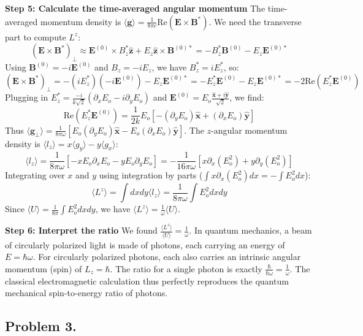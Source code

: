 \begin{solution}
\textbf{Step 5: Calculate the time-averaged angular momentum}
The time-averaged momentum density is $\langle \mathbf{g} \rangle = \frac{1}{8\pi c} \text{Re}(\mathbf{E} \times \mathbf{B}^*)$. We need the transverse part to compute $L^z$:
\[ (\mathbf{E} \times \mathbf{B}^*)_\perp \approx \mathbf{E}^{(0)} \times B_z^* \hat{\mathbf{z}} + E_z \hat{\mathbf{z}} \times \mathbf{B}^{(0)*} = - B_z^* \mathbf{B}^{(0)} - E_z \mathbf{E}^{(0)*} \]
Using $\mathbf{B}^{(0)} = -i \mathbf{E}^{(0)}$ and $B_z = -i E_z$, we have $B_z^* = i E_z^*$, so:
\[ (\mathbf{E} \times \mathbf{B}^*)_\perp = - (i E_z^*) (-i \mathbf{E}^{(0)}) - E_z \mathbf{E}^{(0)*} = - E_z^* \mathbf{E}^{(0)} - E_z \mathbf{E}^{(0)*} = -2 \text{Re}(E_z^* \mathbf{E}^{(0)}) \]
Plugging in $E_z^* = \frac{-i}{k\sqrt{2}} (\partial_x E_o - i \partial_y E_o)$ and $\mathbf{E}^{(0)} = E_o \frac{\hat{\mathbf{x}} + i\hat{\mathbf{y}}}{\sqrt{2}}$, we find:
\[ \text{Re}(E_z^* \mathbf{E}^{(0)}) = \frac{1}{2k} E_o [ -(\partial_y E_o) \hat{\mathbf{x}} + (\partial_x E_o) \hat{\mathbf{y}} ] \]
Thus $\langle \mathbf{g}_\perp \rangle = \frac{1}{8\pi \omega} [ E_o (\partial_y E_o) \hat{\mathbf{x}} - E_o (\partial_x E_o) \hat{\mathbf{y}} ]$.
The $z$-angular momentum density is $\langle l_z \rangle = x \langle g_y \rangle - y \langle g_x \rangle$:
\[ \langle l_z \rangle = \frac{1}{8\pi\omega} \left[ -x E_o \partial_x E_o - y E_o \partial_y E_o \right] = -\frac{1}{16\pi\omega} \left[ x \partial_x (E_o^2) + y \partial_y (E_o^2) \right] \]
Integrating over $x$ and $y$ using integration by parts ($\int x \partial_x (E_o^2) dx = - \int E_o^2 dx$):
\[ \langle L^z \rangle = \int dx dy \langle l_z \rangle = \frac{1}{8\pi\omega} \int E_o^2 dx dy \]
Since $\langle U \rangle = \frac{1}{8\pi} \int E_o^2 dx dy$, we have $\langle L^z \rangle = \frac{1}{\omega} \langle U \rangle$.

\textbf{Step 6: Interpret the ratio}
We found $\frac{\langle L^z \rangle}{\langle U \rangle} = \frac{1}{\omega}$.
In quantum mechanics, a beam of circularly polarized light is made of photons, each carrying an energy of $E = \hbar \omega$. For circularly polarized photons, each also carries an intrinsic angular momentum (spin) of $L_z = \hbar$. The ratio for a single photon is exactly $\frac{\hbar}{\hbar \omega} = \frac{1}{\omega}$. The classical electromagnetic calculation thus perfectly reproduces the quantum mechanical spin-to-energy ratio of photons.
\end{solution}

\subsection*{Problem 3.}

